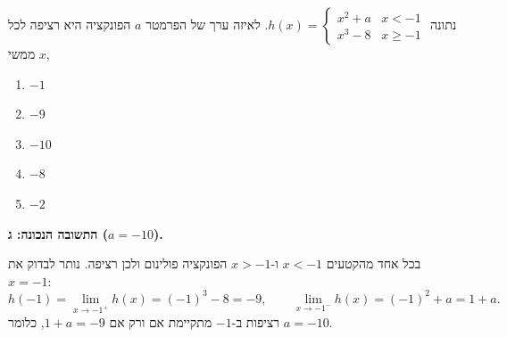 
\begin{question}
נתונה $h(x)=\begin{cases}x^2+a & x<-1\\ x^3-8 & x\ge-1\end{cases}$. לאיזה ערך של הפרמטר $a$ הפונקציה היא רציפה לכל $x$ ממשי,
\begin{enumerate}
  \item $-1$
  \item $-9$
  \item $-10$
  \item $-8$
  \item $-2$
\end{enumerate}
\end{question}

\begin{solution}
\textbf{התשובה הנכונה: ג ($a=-10$).}

בכל אחד מהקטעים $x<-1$ ו-$x>-1$ הפונקציה פולינום ולכן רציפה. נותר לבדוק את $x=-1$:
\[ h(-1)=\lim_{x\to-1^+}h(x)=(-1)^3-8=-9,\qquad \lim_{x\to-1^-}h(x)=(-1)^2+a=1+a . \]
רציפות ב-$-1$ מתקיימת אם ורק אם $1+a=-9$, כלומר $a=-10$.
\end{solution}
